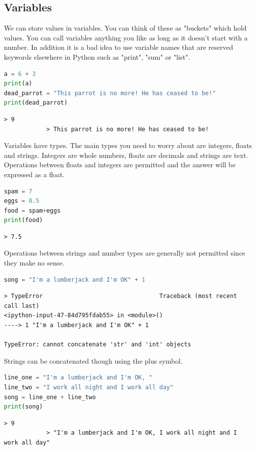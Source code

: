 	\subsection{Variables}\label{types}
		We can store values in variables. You can think of these as "buckets" which hold values. You can call variables anything you like as long as it doesn't start with a number. In addition it is a bad idea to use variable names that are reserved keywords elsewhere in Python such as "print", "sum" or "list". 
		\begin{lstlisting}[language=Python]
a = 6 + 3
print(a)
dead_parrot = "This parrot is no more! He has ceased to be!"
print(dead_parrot)\end{lstlisting}
		\begin{verbatim}> 9
			> This parrot is no more! He has ceased to be!
		\end{verbatim}
		Variables have types. The main types you need to worry about are integers, floats and strings. Integers are whole numbers, floats are decimals and strings are text. Operations between floats and integers are permitted and the answer will be expressed as a float.
		\begin{lstlisting}[language=Python]
spam = 7
eggs = 0.5
food = spam+eggs
print(food)
\end{lstlisting}
		\begin{verbatim}> 7.5\end{verbatim}	
		Operations between strings and number types are generally not permitted since they make no sense.
		\begin{lstlisting}[language=Python]
song = "I'm a lumberjack and I'm OK" + 1\end{lstlisting}
		\begin{verbatim}> TypeError                                 Traceback (most recent call last)
<ipython-input-47-84d795fdab55> in <module>()
----> 1 "I'm a lumberjack and I'm OK" + 1

TypeError: cannot concatenate 'str' and 'int' objects\end{verbatim}

Strings can be concatenated though using the plus symbol.	
		\begin{lstlisting}[language=Python]
line_one = "I'm a lumberjack and I'm OK, "
line_two = "I work all night and I work all day"
song = line_one + line_two
print(song)\end{lstlisting}
		\begin{verbatim}> 9
			> "I'm a lumberjack and I'm OK, I work all night and I work all day"
		\end{verbatim}

